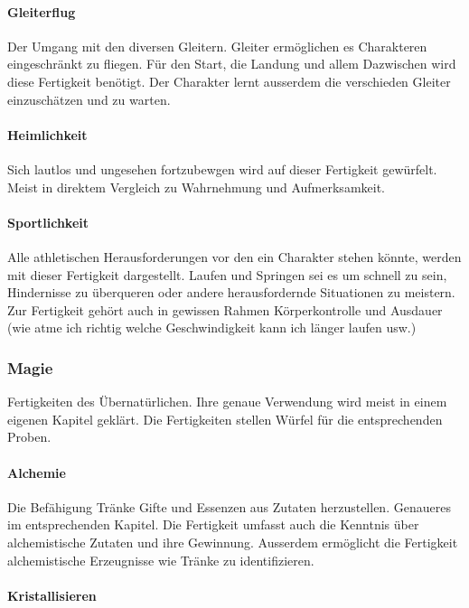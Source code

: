 \documentclass{article}
\begin{document}
\paragraph{Gleiterflug}

Der Umgang mit den diversen Gleitern. Gleiter ermöglichen es Charakteren eingeschränkt zu fliegen. Für den Start, die
Landung und allem Dazwischen wird diese Fertigkeit benötigt. Der Charakter lernt ausserdem die verschieden Gleiter
einzuschätzen und zu warten.

\paragraph{Heimlichkeit}

Sich lautlos und ungesehen fortzubewgen wird auf dieser Fertigkeit gewürfelt. Meist in direktem Vergleich zu
Wahrnehmung und Aufmerksamkeit.

\paragraph{Sportlichkeit}

Alle athletischen Herausforderungen vor den ein Charakter stehen könnte, werden mit dieser Fertigkeit dargestellt.
Laufen und Springen sei es um schnell zu sein, Hindernisse zu überqueren oder andere herausfordernde Situationen zu
meistern. Zur Fertigkeit gehört auch in gewissen Rahmen Körperkontrolle und Ausdauer (wie atme ich richtig welche
Geschwindigkeit kann ich länger laufen usw.)

\subsubsection{Magie}

Fertigkeiten des Übernatürlichen. Ihre genaue Verwendung wird meist in einem eigenen Kapitel geklärt. Die
Fertigkeiten stellen Würfel für die entsprechenden Proben.

\paragraph{Alchemie}

Die Befähigung Tränke Gifte und Essenzen aus Zutaten herzustellen. Genaueres im entsprechenden Kapitel. Die Fertigkeit
umfasst auch die Kenntnis über alchemistische Zutaten und ihre Gewinnung. Ausserdem ermöglicht die Fertigkeit
alchemistische Erzeugnisse wie Tränke zu identifizieren.

\paragraph{Kristallisieren}
\end{document}
